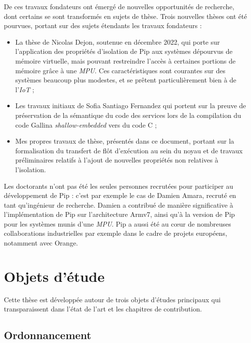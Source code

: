 De ces travaux fondateurs ont émergé de nouvelles opportunités de recherche, dont certains se sont transformés en sujets de thèse. Trois nouvelles thèses ont été pourvues, portant sur des sujets étendants les travaux fondateurs :
\begin{itemize}
	\item La thèse de Nicolas Dejon, soutenue en décembre 2022, qui porte sur l'application des propriétés d'isolation de Pip aux systèmes dépourvus de mémoire virtuelle, mais pouvant restreindre l'accès à certaines portions de mémoire grâce à une \emph{MPU}. Ces caractéristiques sont courantes sur des systèmes beaucoup plus modestes, et se prêtent particulièrement bien à de l'\emph{IoT} ;
	\item Les travaux initiaux de Sofia Santiago Fernandez qui portent sur la preuve de préservation de la sémantique du code des services lors de la compilation du code Gallina \emph{shallow-embedded} vers du code C ;
	\item Mes propres travaux de thèse, présentés dans ce document, portant sur la formalisation du transfert de flôt d'exécution au sein du noyau et de travaux préliminaires relatifs à l'ajout de nouvelles propriétés non relatives à l'isolation.
\end{itemize}

Les doctorants n'ont pas été les seules personnes recrutées pour participer au développement de Pip : c'est par exemple le cas de Damien Amara, recruté en tant qu'ingénieur de recherche. Damien a contribué de manière significative à l'implémentation de Pip sur l'architecture Armv7, ainsi qu'à la version de Pip pour les systèmes munis d'une \emph{MPU}. Pip a aussi été au cœur de nombreuses collaborations industrielles par exemple dans le cadre de projets européens, notamment avec Orange.

\section{Objets d'étude}

Cette thèse est développée autour de trois objets d'études principaux qui transparaissent dans l'état de l'art et les chapitres de contribution.

\subsection{Ordonnancement}

